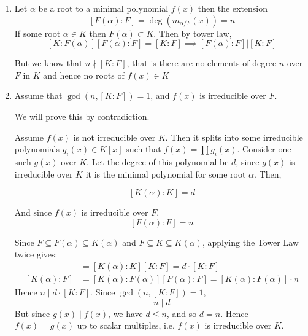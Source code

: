 \documentclass[12pt]{article}
\begin{document}
\begin{solution}
    \bbni
    \begin{enumerate}
        \item  Let $\alpha$ be a root to a minimal polynomial $f(x)$ then the extension \[[F(\alpha): F] = \deg(m_{\alpha/F}(x)) = n\] If some root $\alpha \in K$ then $F(\alpha) \subset K$. Then by tower law, \[[K:F(\alpha)][F(\alpha):F] = [K:F] \implies [F(\alpha):F] \big | [K:F]\] 
        
        But we know that $n \nmid [K:F]$, that is there are no elements of degree $n$ over $F$ in $K$ and hence no roots of $f(x) \in K$

        \item Assume that $\gcd(n, [K:F]) = 1$, and $f(x)$ is irreducible over $F$. 
        
        We will prove this by contradiction. 
        
        Assume $f(x)$ is not irreducible over $K$. Then it splits into some irreducible polynomials $g_i(x) \in K[x]$ such that $f(x) = \prod g_i(x)$. 
        Consider one such $g(x)$ over $K$. Let the degree of this polynomial be $d$, since $g(x)$ is irreducible over $K$ it is the minimal polynomial for some root $\alpha$. Then, 
        
        \[[K(\alpha) : K] = d\]

        And since $f(x)$ is irreducible over $F$,
        \[[F(\alpha) : F] = n\]

        Since $F \subseteq F(\alpha) \subseteq K(\alpha)$ and $F \subseteq K \subseteq K(\alpha)$, 
        applying the Tower Law twice gives:
        \begin{align*}
        [K(\alpha):F] &= [K(\alpha):K][K:F] = d\cdot[K:F] \\
        [K(\alpha):F] &= [K(\alpha):F(\alpha)][F(\alpha):F] = [K(\alpha):F(\alpha)]\cdot n
        \end{align*}
        Hence $n \mid d\cdot[K:F]$. Since $\gcd(n,[K:F])=1$, 
        \[n \mid d\]
        But since $g(x) \mid f(x)$, we have $d \leq n$, and so $d = n$. Hence $f(x) = g(x)$ 
        up to scalar multiples, i.e. $f(x)$ is irreducible over $K$.
    \end{enumerate}
\end{solution}

\newpage 
\end{document}
